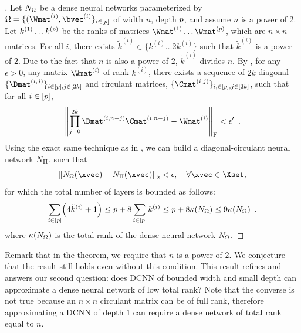 \begin{proof}[]
  Let $N_\Omega$ be a dense neural networks parameterized by $\Omega = \{( \Wmat^{(i)}, \bvec^{(i)} \}_{i \in [\depth]}$ of width $n$, depth $p$, and assume $n$ is a power of 2.
  Let $k^{(1)} \ldots k^{(p)}$ be the ranks of matrices $\Wmat^{(1)} \ldots \Wmat^{(\depth)}$, which are $n \times n$ matrices.
  For all $i$, there exists $\tilde{k}^{(i)} \in \{ k^{(i)} \ldots 2 k^{(i)} \}$ such that $\tilde{k}^{(i)}$ is a power of $2$.
  Due to the fact that $n$ is also a power of $2$, $\tilde{k}^{(i)}$ divides $n$.
  By , for any $\epsilon > 0$, any matrix $\Wmat^{(i)}$ of rank $k^{(i)}$, there exists a sequence of $2k$ diagonal $\{\Dmat^{(i, j)}\}_{i \in [\depth], j \in [2k]}$ and circulant matrices, $\{\Cmat^{(i, j)}\}_{i, \in [\depth], j \in [2k]}$, such that for all $i \in [p]$,
  \begin{equation}
    \norm{\prod_{j=0}^{2k} \Dmat^{(i,n-j)} \Cmat^{(i,n-j)} - \Wmat^{(i)}}_\fro < \epsilon' \enspace.
  \end{equation}
  Using the exact same technique as in , we can build a diagonal-circulant neural network $N_\Pi$, such that
  \begin{equation}
    \norm{ \nn_\Omega (\xvec) - \nn_\Pi (\xvec)}_2 < \epsilon, \quad \forall \xvec \in \Xset,
  \end{equation}
  for which the total number of layers is bounded as follows:
  \begin{equation}
    \sum_{i \in [\depth]} \left( 4 \tilde{k}^{(i)} + 1 \right) \le \depth + 8 \sum_{i \in [\depth]} k^{(i)} \le \depth + 8 \kappa(\nn_\Omega) \le 9 \kappa(\nn_\Omega) \enspace. 
  \end{equation}
  where $\kappa(N_\Omega)$ is the total rank of the dense neural network $N_\Omega$.
\end{proof}


\noindent
Remark that in the theorem, we require that $n$ is a power of $2$.
We conjecture that the result still holds even without this condition.
This result refines  and answers our second question: does DCNN of bounded width and small depth can approximate a dense neural network of low total rank?
Note that the converse is not true because an $n \times n$ circulant matrix can be of full rank, therefore approximating a DCNN of depth $1$ can require a dense network of total rank equal to $n$.

